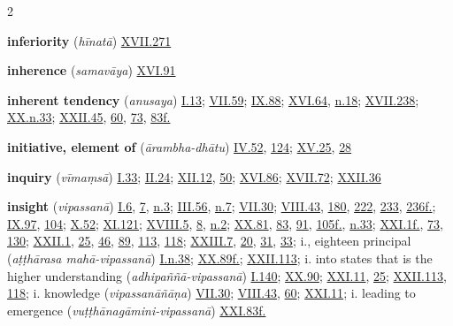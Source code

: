 \begin{multicols}{2}
\begin{vismHanging}
\par\textbf{inferiority} (\emph{hīnatā}) \hyperlink{XVII.271}{XVII.271}{}
\par\textbf{inherence} (\emph{samavāya}) \hyperlink{XVI.91}{XVI.91}{}
\par\textbf{inherent tendency} (\emph{anusaya}) \hyperlink{I.13}{I.13}{}; \hyperlink{VII.59}{VII.59}{}; \hyperlink{IX.88}{IX.88}{}; \hyperlink{XVI.64}{XVI.64}{}, \hyperlink{XVI.n18}{n.18}{}; \hyperlink{XVII.238}{XVII.238}{}; \hyperlink{XX.n33}{XX.n.33}{}; \hyperlink{XXII.45}{XXII.45}{}, \hyperlink{XXII.60}{60}{}, \hyperlink{XXII.73}{73}{}, \hyperlink{XXII.83}{83f.}{}
\par\textbf{initiative, element of} (\emph{ārambha-dhātu}) \hyperlink{IV.52}{IV.52}{}, \hyperlink{IV.124}{124}{}; \hyperlink{XV.25}{XV.25}{}, \hyperlink{XV.28}{28}{}
\par\textbf{inquiry} (\emph{vīmaṃsā}) \hyperlink{I.33}{I.33}{}; \hyperlink{II.24}{II.24}{}; \hyperlink{XII.12}{XII.12}{}, \hyperlink{XII.50}{50}{}; \hyperlink{XVI.86}{XVI.86}{}; \hyperlink{XVII.72}{XVII.72}{}; \hyperlink{XXII.36}{XXII.36}{}
\par\textbf{insight} (\emph{vipassanā}) \hyperlink{I.6}{I.6}{}, \hyperlink{I.7}{7}{}, \hyperlink{I.n3}{n.3}{}; \hyperlink{III.56}{III.56}{}, \hyperlink{III.n7}{n.7}{}; \hyperlink{VII.30}{VII.30}{}; \hyperlink{VIII.43}{VIII.43}{}, \hyperlink{VIII.180}{180}{}, \hyperlink{VIII.222}{222}{}, \hyperlink{VIII.233}{233}{}, \hyperlink{VIII.236}{236f.}{}; \hyperlink{IX.97}{IX.97}{}, \hyperlink{IX.104}{104}{}; \hyperlink{X.52}{X.52}{}; \hyperlink{XI.121}{XI.121}{}; \hyperlink{XVIII.5}{XVIII.5}{}, \hyperlink{XVIII.8}{8}{}, \hyperlink{XVIII.n2}{n.2}{}; \hyperlink{XX.81}{XX.81}{}, \hyperlink{XX.83}{83}{}, \hyperlink{XX.91}{91}{}, \hyperlink{XX.105}{105f.}{}, \hyperlink{XX.n33}{n.33}{}; \hyperlink{XXI.1}{XXI.1f.}{}, \hyperlink{XXI.73}{73}{}, \hyperlink{XXI.130}{130}{}; \hyperlink{XXII.1}{XXII.1}{}, \hyperlink{XXII.25}{25}{}, \hyperlink{XXII.46}{46}{}, \hyperlink{XXII.89}{89}{}, \hyperlink{XXII.113}{113}{}, \hyperlink{XXII.118}{118}{}; \hyperlink{XXIII.7}{XXIII.7}{}, \hyperlink{XXIII.20}{20}{}, \hyperlink{XXIII.31}{31}{}, \hyperlink{XXIII.33}{33}{}; i., eighteen principal (\emph{aṭṭhārasa mahā-vipassanā}) \hyperlink{I.n38}{I.n.38}{}; \hyperlink{XX.89}{XX.89f.}{}; \hyperlink{XXII.113}{XXII.113}{}; i. into states that is the higher understanding (\emph{adhipaññā-vipassanā}) \hyperlink{I.140}{I.140}{}; \hyperlink{XX.90}{XX.90}{}; \hyperlink{XXI.11}{XXI.11}{}, \hyperlink{XXI.25}{25}{}; \hyperlink{XXII.113}{XXII.113}{}, \hyperlink{XXII.118}{118}{}; i. knowledge (\emph{vipassanāñāṇa}) \hyperlink{VII.30}{VII.30}{}; \hyperlink{VIII.43}{VIII.43}{}, \hyperlink{VIII.60}{60}{}; \hyperlink{XXI.11}{XXI.11}{}; i. leading to emergence (\emph{vuṭṭhānagāmini-vipassanā}) \hyperlink{XXI.83}{XXI.83f.}{}

\end{vismHanging}
\end{multicols}
